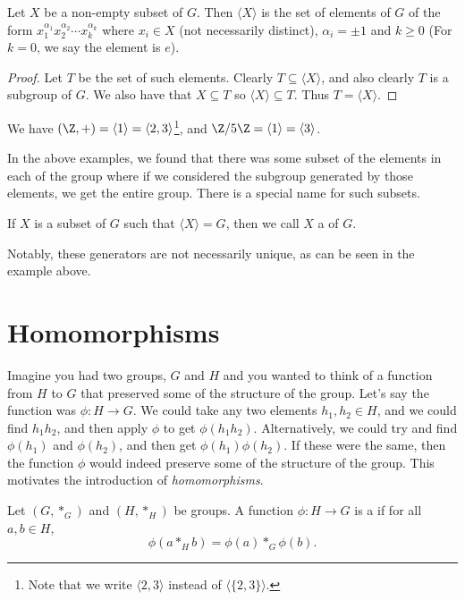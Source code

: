 \documentclass[a4]{scrreprt}
\newcommand{\newsection}{\section}
\begin{document}
\begin{proposition}
	Let $X$ be a non-empty subset of $G$. Then $\langle X \rangle$ is the set of elements of $G$ of the form 
	$x_1^{\alpha_1} x_2^{\alpha_2} \cdots x_k^{\alpha_k}$ where $x_i \in X$ (not necessarily distinct), $\alpha_i = \pm 1$ and $k \geq 0$
	(For $k = 0$, we say the element is $e$).
\end{proposition}
\begin{proof}
	Let $T$ be the set of such elements. Clearly $T \subseteq \langle X \rangle$, and also clearly $T$ is a subgroup of $G$. We also have that $X \subseteq T$ so $\langle X \rangle \subseteq T$. Thus $T = \langle X \rangle$.
\end{proof}
  
\begin{example}
	We have $(\Z, +) = \langle 1 \rangle = \langle 2, 3 \rangle$\footnote{Note that we write $\langle 2, 3\rangle$ instead of $\langle \{2, 3\} \rangle$.}, and $\Z/5\Z = \langle 1 \rangle = \langle 3 \rangle$.
\end{example}

In the above examples, we found that there was some subset of the elements in each of the group where if we considered the subgroup generated by those elements, we get the entire group.
There is a special name for such subsets.

\begin{definition}[Generators]\label{def:generator}
	If $X$ is a subset of $G$ such that $\langle X \rangle = G$, then we call $X$ a  of $G$.
\end{definition}

Notably, these generators are not necessarily unique, as can be seen in the example above.


\newsection{Homomorphisms}

Imagine you had two groups, $G$ and $H$ and you wanted to think of a function from $H$ to $G$ that preserved some of the structure of the group.
Let's say the function was $\phi : H \rightarrow G$. We could take any two elements $h_1, h_2 \in H$, and we could find $h_1 h_2$, and then apply $\phi$ to get $\phi(h_1 h_2)$.
Alternatively, we could try and find $\phi(h_1)$ and $\phi(h_2)$, and then get $\phi(h_1) \phi(h_2)$. If these were the same, then the function $\phi$ would indeed preserve some of the structure of the group. This motivates the introduction of \emph{homomorphisms}.

\begin{definition}[Homomorphism]
	Let $(G, *_G)$ and $(H, *_H)$ be groups. A function $\phi : H \rightarrow G$ is a  if for all $a, b \in H$,
	$$
	\phi(a *_H b) = \phi(a) *_G \phi(b).
	$$
\end{definition}
\end{document}

